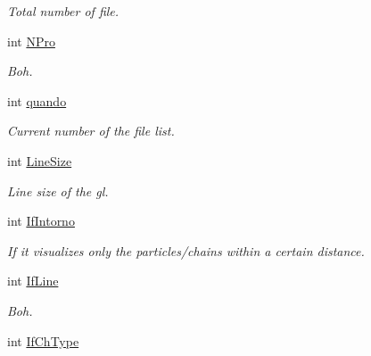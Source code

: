\begin{DoxyCompactItemize}
\begin{DoxyCompactList}\small\item\em Total number of file. \end{DoxyCompactList}\item 
int \hyperlink{classElPoly_a1ec5265fae2a3e11f0ee82db6a536ec5}{N\+Pro}\hypertarget{classElPoly_a1ec5265fae2a3e11f0ee82db6a536ec5}{}\label{classElPoly_a1ec5265fae2a3e11f0ee82db6a536ec5}

\begin{DoxyCompactList}\small\item\em Boh. \end{DoxyCompactList}\item 
int \hyperlink{classElPoly_af67f045188086b91309e231e77a86076}{quando}\hypertarget{classElPoly_af67f045188086b91309e231e77a86076}{}\label{classElPoly_af67f045188086b91309e231e77a86076}

\begin{DoxyCompactList}\small\item\em Current number of the file list. \end{DoxyCompactList}\item 
int \hyperlink{classElPoly_a676418848d4d134fdefd0bda050ddea1}{Line\+Size}\hypertarget{classElPoly_a676418848d4d134fdefd0bda050ddea1}{}\label{classElPoly_a676418848d4d134fdefd0bda050ddea1}

\begin{DoxyCompactList}\small\item\em Line size of the gl. \end{DoxyCompactList}\item 
int \hyperlink{classElPoly_aa08916cc778623ef039a8c2062b0e545}{If\+Intorno}\hypertarget{classElPoly_aa08916cc778623ef039a8c2062b0e545}{}\label{classElPoly_aa08916cc778623ef039a8c2062b0e545}

\begin{DoxyCompactList}\small\item\em If it visualizes only the particles/chains within a certain distance. \end{DoxyCompactList}\item 
int \hyperlink{classElPoly_ac3e70209b515c8a6293fcdb019a2fb29}{If\+Line}
\begin{DoxyCompactList}\small\item\em Boh. \end{DoxyCompactList}\item 
int \hyperlink{classElPoly_ac79c99da0d26e5f99e97572f425482ec}{If\+Ch\+Type}\hypertarget{classElPoly_ac79c99da0d26e5f99e97572f425482ec}{}\label{classElPoly_ac79c99da0d26e5f99e97572f425482ec}


\end{DoxyCompactItemize}
